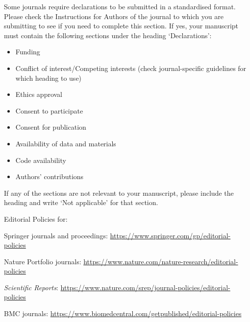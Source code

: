 \documentclass[sn-nature]{sn-jnl}%
\begin{document}
Some journals require declarations to be submitted in a standardised format. Please check the Instructions for Authors of the journal to which you are submitting to see if you need to complete this section. If yes, your manuscript must contain the following sections under the heading `Declarations':

\begin{itemize}
\item Funding
\item Conflict of interest/Competing interests (check journal-specific guidelines for which heading to use)
\item Ethics approval 
\item Consent to participate
\item Consent for publication
\item Availability of data and materials
\item Code availability 
\item Authors' contributions
\end{itemize}

\noindent
If any of the sections are not relevant to your manuscript, please include the heading and write `Not applicable' for that section. 

\bigskip
\begin{flushleft}%
Editorial Policies for:

\bigskip\noindent
Springer journals and proceedings: \url{https://www.springer.com/gp/editorial-policies}

\bigskip\noindent
Nature Portfolio journals: \url{https://www.nature.com/nature-research/editorial-policies}

\bigskip\noindent
\textit{Scientific Reports}: \url{https://www.nature.com/srep/journal-policies/editorial-policies}

\bigskip\noindent
BMC journals: \url{https://www.biomedcentral.com/getpublished/editorial-policies}
\end{flushleft}
\end{document}
